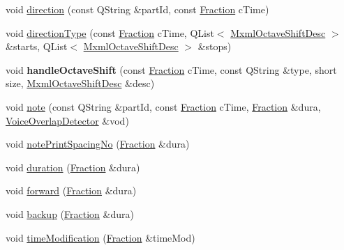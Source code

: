 \begin{DoxyCompactItemize}
void \hyperlink{class_ms_1_1_music_x_m_l_parser_pass1_a5a81de5bea8927e52140306a2fba53b0}{direction} (const Q\+String \&part\+Id, const \hyperlink{class_ms_1_1_fraction}{Fraction} c\+Time)
\item 
void \hyperlink{class_ms_1_1_music_x_m_l_parser_pass1_a67b9401bb4719c4ee6b760f31e2282e8}{direction\+Type} (const \hyperlink{class_ms_1_1_fraction}{Fraction} c\+Time, Q\+List$<$ \hyperlink{struct_ms_1_1_mxml_octave_shift_desc}{Mxml\+Octave\+Shift\+Desc} $>$ \&starts, Q\+List$<$ \hyperlink{struct_ms_1_1_mxml_octave_shift_desc}{Mxml\+Octave\+Shift\+Desc} $>$ \&stops)
\item 
\mbox{\label{class_ms_1_1_music_x_m_l_parser_pass1_ac8dd5ac5d66d6520d67788636e3a0b0b}} 
void {\bfseries handle\+Octave\+Shift} (const \hyperlink{class_ms_1_1_fraction}{Fraction} c\+Time, const Q\+String \&type, short size, \hyperlink{struct_ms_1_1_mxml_octave_shift_desc}{Mxml\+Octave\+Shift\+Desc} \&desc)
\item 
void \hyperlink{class_ms_1_1_music_x_m_l_parser_pass1_ad4313551e5931ebeaf8abd78502ece9d}{note} (const Q\+String \&part\+Id, const \hyperlink{class_ms_1_1_fraction}{Fraction} c\+Time, \hyperlink{class_ms_1_1_fraction}{Fraction} \&dura, \hyperlink{class_ms_1_1_voice_overlap_detector}{Voice\+Overlap\+Detector} \&vod)
\item 
void \hyperlink{class_ms_1_1_music_x_m_l_parser_pass1_a49918520d96cdff24a634c35cae34331}{note\+Print\+Spacing\+No} (\hyperlink{class_ms_1_1_fraction}{Fraction} \&dura)
\item 
void \hyperlink{class_ms_1_1_music_x_m_l_parser_pass1_ad2ecac228c9a223bf03c8d373a6be26c}{duration} (\hyperlink{class_ms_1_1_fraction}{Fraction} \&dura)
\item 
void \hyperlink{class_ms_1_1_music_x_m_l_parser_pass1_a293da30da73224784aaf1e4228eea390}{forward} (\hyperlink{class_ms_1_1_fraction}{Fraction} \&dura)
\item 
void \hyperlink{class_ms_1_1_music_x_m_l_parser_pass1_a551f4d1ca22cbccdab8fe8dce077512d}{backup} (\hyperlink{class_ms_1_1_fraction}{Fraction} \&dura)
\item 
void \hyperlink{class_ms_1_1_music_x_m_l_parser_pass1_ac9feadbc3a95595e36c5ed1287beb665}{time\+Modification} (\hyperlink{class_ms_1_1_fraction}{Fraction} \&time\+Mod)
\item 
\mbox{\label{class_ms_1_1_music_x_m_l_parser_pass1_ad7150c9fab9c112eed3e0e9ecde6602b}} 

\end{DoxyCompactItemize}
